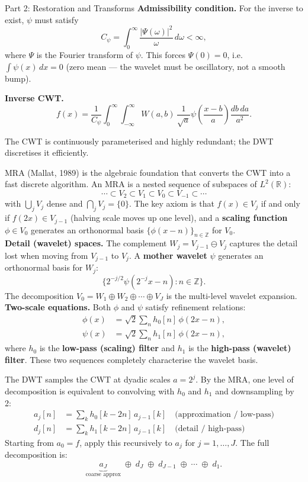\documentclass[letterpaper]{article}
\begin{document}
\begin{notes}{Part 2: Restoration and Transforms}
\textbf{Admissibility condition.} For the inverse to exist, $\psi$ must satisfy
$$C_\psi = \int_0^{\infty} \frac{|\Psi(\omega)|^2}{\omega}\,d\omega < \infty,$$
where $\Psi$ is the Fourier transform of $\psi$. This forces $\Psi(0) = 0$, i.e.\ $\int \psi(x)\,dx = 0$ (zero mean — the wavelet must be oscillatory, not a smooth bump).

\textbf{Inverse CWT.}
$$f(x) = \frac{1}{C_\psi}\int_0^{\infty}\int_{-\infty}^{\infty} W(a,b)\,\frac{1}{\sqrt{a}}\psi\!\left(\frac{x-b}{a}\right)\frac{db\,da}{a^2}.$$

The CWT is continuously parameterised and highly redundant; the DWT discretises it efficiently.


MRA (Mallat, 1989) is the algebraic foundation that converts the CWT into a fast discrete algorithm. An MRA is a nested sequence of subspaces of $L^2(\mathbb{R})$:
$$\cdots \subset V_2 \subset V_1 \subset V_0 \subset V_{-1} \subset \cdots$$
with $\bigcup_j V_j$ dense and $\bigcap_j V_j = \{0\}$. The key axiom is that $f(x)\in V_j$ if and only if $f(2x)\in V_{j-1}$ (halving scale moves up one level), and a \textbf{scaling function} $\phi\in V_0$ generates an orthonormal basis $\{\phi(x-n)\}_{n\in\mathbb{Z}}$ for $V_0$.\\

\textbf{Detail (wavelet) spaces.} The complement $W_j = V_{j-1}\ominus V_j$ captures the detail lost when moving from $V_{j-1}$ to $V_j$. A \textbf{mother wavelet} $\psi$ generates an orthonormal basis for $W_j$:
$$\{2^{-j/2}\psi(2^{-j}x - n) : n\in\mathbb{Z}\}.$$
The decomposition $V_0 = W_1\oplus W_2\oplus\cdots\oplus V_J$ is the multi-level wavelet expansion.\\

\textbf{Two-scale equations.} Both $\phi$ and $\psi$ satisfy refinement relations:
\begin{align*}
\phi(x) &= \sqrt{2}\sum_n h_0[n]\,\phi(2x-n), \\
\psi(x) &= \sqrt{2}\sum_n h_1[n]\,\phi(2x-n),
\end{align*}
where $h_0$ is the \textbf{low-pass (scaling) filter} and $h_1$ is the \textbf{high-pass (wavelet) filter}. These two sequences completely characterise the wavelet basis.



The DWT samples the CWT at dyadic scales $a=2^j$. By the MRA, one level of decomposition is equivalent to convolving with $h_0$ and $h_1$ and downsampling by 2:
\begin{align*}
a_j[n] &= \sum_k h_0[k-2n]\,a_{j-1}[k] \quad \text{(approximation / low-pass)}\\
d_j[n] &= \sum_k h_1[k-2n]\,a_{j-1}[k] \quad \text{(detail / high-pass)}
\end{align*}
Starting from $a_0 = f$, apply this recursively to $a_j$ for $j=1,\ldots,J$. The full decomposition is:
$$\underbrace{a_J}_{\text{coarse approx}} \;\oplus\; d_J \;\oplus\; d_{J-1} \;\oplus\; \cdots \;\oplus\; d_1.$$


\end{notes}
\end{document}
